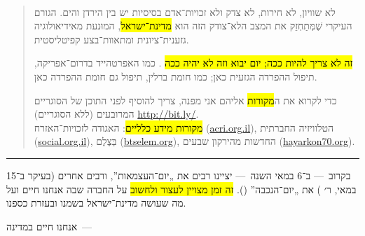 \\

\begin{quote}
לא שוויון, לא חירות, לא צדק ולא זכויות־אדם בסיסיות יש בין הירדן והים. הגורם העיקרי שֶׁמְּתַחְזֵק את המצב הלא־צודק הזה הוא \hl{מדינת־ישראל}, המוּנעת מאידיאולוגיה גזענית־ציונית ומתאוות־בצע קפיטליסטית.

\hl{זה לא צריך להיות ככה; יום יבוא וזה לא יהיה ככה }. כמו האפרטהייד בדרום־אפריקה, תיפול ההפרדה הגזעית כאן; כמו חומת ברלין, תיפול גם חומת ההפרדה כאן.


{\small כדי לקרוא את ה\hl{מקורות} אליהם אני מפנה, צריך להוסיף לפני התוכן של הסוגריים המרובעים (ללא הסוגריים) {\mbox{\url{http://bit.ly/}}}.\\
\hl{מקורות מידע כלליים}: האגודה לזכויות־האזרח (\mbox{\url{acri.org.il}}), הטלוויזיה החברתית (\mbox{\url{social.org.il}}), בְּצֶלֶם (\mbox{\url{btselem.org}}), החדשות מהירקון שבעים (\mbox{\url{hayarkon70.org}}).}
\end{quote}

\hrule

בקרוב~— ב־6 במאי השנה~— יציינו רבים את „יום־העצמ{\small א}ות”, ורבים אחרים (בעיקר ב־15 במאי, ר׳ ) את „יום־הנכבה” (). \hl{זה זמן מצויין לעצור ולחשוב} על החברה שבה אנחנו חיים ועל מה שעושה מדינת־ישראל בשמנו ובעזרת כספנו.

{\setlength\parindent{-0.5em}\Large אנחנו חיים במדינה~—}

